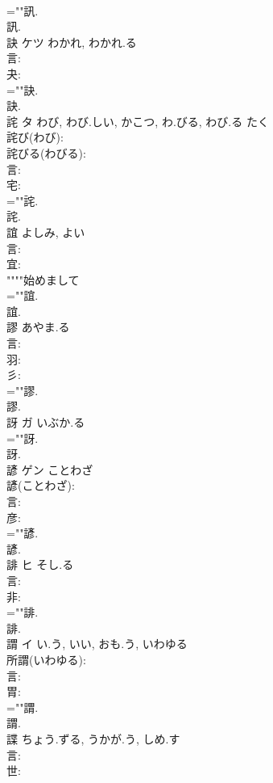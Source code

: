 \documentclass[8pt]{extreport}
\begin{document}
\begin{CJK}{UTF8}{min}
\\	=""訊.
\\	訊.
\\	訣	ケツ	わかれ, わかれ.る		
\\	言: 
\\	夬: 
\\	=""訣.
\\	訣.
\\	詫	タ	わび, わび.しい, かこつ, わ.びる, わび.る	たく	
\\	詫び(わび): 
\\	詫びる(わびる): 
\\	言: 
\\	宅: 
\\	=""詫.
\\	詫.
\\	誼		よしみ, よい				
\\	言: 
\\	宜: 
\\	""""始めまして
\\	=""誼.
\\	誼.
\\	謬		あやま.る				
\\	言: 
\\	羽: 
\\	彡: 
\\	=""謬.
\\	謬.
\\	訝	ガ いぶか.る			
\\	=""訝.
\\	訝.
\\	諺	ゲン	ことわざ		
\\	諺(ことわざ): 
\\	言: 
\\	彦: 
\\	=""諺.
\\	諺.
\\	誹	ヒ	そし.る		
\\	言: 
\\	非: 
\\	=""誹.
\\	誹.
\\	謂	イ	い.う, いい, おも.う, いわゆる		
\\	所謂(いわゆる): 
\\	言: 
\\	胃: 
\\	=""謂.
\\	謂.
\\	諜		ちょう.ずる, うかが.う, しめ.す				
\\	言: 
\\	世: 

\end{CJK}
\end{document}

